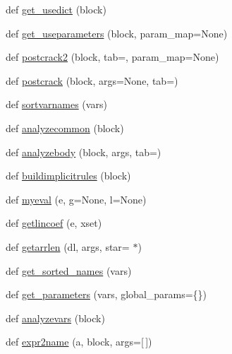 \begin{DoxyCompactItemize}
\item 
def \hyperlink{namespacenumpy_1_1f2py_1_1crackfortran_a376921b8827964998beaeefe0a0d6879}{get\+\_\+usedict} (block)
\item 
def \hyperlink{namespacenumpy_1_1f2py_1_1crackfortran_aaaab20c87aafcd5479f05806a0caa308}{get\+\_\+useparameters} (block, param\+\_\+map=None)
\item 
def \hyperlink{namespacenumpy_1_1f2py_1_1crackfortran_aaa387512dd8d9345daaa068037640693}{postcrack2} (block, tab=\textquotesingle{}\textquotesingle{}, param\+\_\+map=None)
\item 
def \hyperlink{namespacenumpy_1_1f2py_1_1crackfortran_a9aff94256874995344b97b2eb1190a1e}{postcrack} (block, args=None, tab=\textquotesingle{}\textquotesingle{})
\item 
def \hyperlink{namespacenumpy_1_1f2py_1_1crackfortran_a6420b73fc8b27b759adca406b0de57b4}{sortvarnames} (vars)
\item 
def \hyperlink{namespacenumpy_1_1f2py_1_1crackfortran_a96d9d3932297be9c22b108da0e9ca541}{analyzecommon} (block)
\item 
def \hyperlink{namespacenumpy_1_1f2py_1_1crackfortran_a3d4fc16db82d26a8a4ea1b50639d8426}{analyzebody} (block, args, tab=\textquotesingle{}\textquotesingle{})
\item 
def \hyperlink{namespacenumpy_1_1f2py_1_1crackfortran_a046e07d1fbf5230cbcad0db3b6a42744}{buildimplicitrules} (block)
\item 
def \hyperlink{namespacenumpy_1_1f2py_1_1crackfortran_ab48de57fe53154548a44f474de94adef}{myeval} (e, g=None, l=None)
\item 
def \hyperlink{namespacenumpy_1_1f2py_1_1crackfortran_a21249b22429898a6922052332c6b109c}{getlincoef} (e, xset)
\item 
def \hyperlink{namespacenumpy_1_1f2py_1_1crackfortran_a6ba36bc9a1b76a211697c6b74848b127}{getarrlen} (dl, args, star=\textquotesingle{} $\ast$\textquotesingle{})
\item 
def \hyperlink{namespacenumpy_1_1f2py_1_1crackfortran_aeaf7cc830f5d2a556c96f53fcdf92cb0}{get\+\_\+sorted\+\_\+names} (vars)
\item 
def \hyperlink{namespacenumpy_1_1f2py_1_1crackfortran_a550260a59f6c8c8b9ffa741acd3568a3}{get\+\_\+parameters} (vars, global\+\_\+params=\{\})
\item 
def \hyperlink{namespacenumpy_1_1f2py_1_1crackfortran_a50c841301b94d866d2bbdb569ea2304c}{analyzevars} (block)
\item 
def \hyperlink{namespacenumpy_1_1f2py_1_1crackfortran_ad715c51dd246af5edf200c4a14430feb}{expr2name} (a, block, args=\mbox{[}$\,$\mbox{]})

\end{DoxyCompactItemize}
